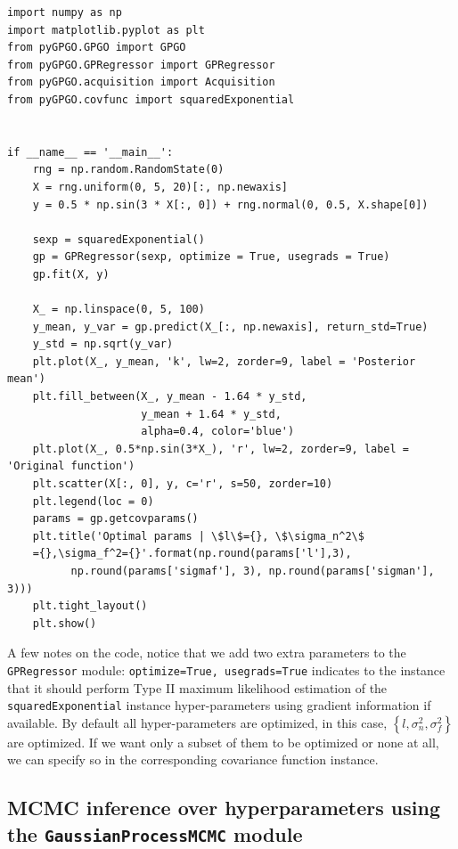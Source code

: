 \documentclass[10pt,a4paper,twoside]{book}
\begin{document}
\begin{verbatim}
import numpy as np
import matplotlib.pyplot as plt
from pyGPGO.GPGO import GPGO
from pyGPGO.GPRegressor import GPRegressor
from pyGPGO.acquisition import Acquisition
from pyGPGO.covfunc import squaredExponential


if __name__ == '__main__':
    rng = np.random.RandomState(0)
    X = rng.uniform(0, 5, 20)[:, np.newaxis]
    y = 0.5 * np.sin(3 * X[:, 0]) + rng.normal(0, 0.5, X.shape[0])

    sexp = squaredExponential()
    gp = GPRegressor(sexp, optimize = True, usegrads = True)
    gp.fit(X, y)

    X_ = np.linspace(0, 5, 100)
    y_mean, y_var = gp.predict(X_[:, np.newaxis], return_std=True)
    y_std = np.sqrt(y_var)
    plt.plot(X_, y_mean, 'k', lw=2, zorder=9, label = 'Posterior mean')
    plt.fill_between(X_, y_mean - 1.64 * y_std,
                     y_mean + 1.64 * y_std,
                     alpha=0.4, color='blue')
    plt.plot(X_, 0.5*np.sin(3*X_), 'r', lw=2, zorder=9, label = 'Original function')
    plt.scatter(X[:, 0], y, c='r', s=50, zorder=10)
    plt.legend(loc = 0)
    params = gp.getcovparams()
    plt.title('Optimal params | \$l\$={}, \$\sigma_n^2\$
    ={},\sigma_f^2={}'.format(np.round(params['l'],3),
    	  np.round(params['sigmaf'], 3), np.round(params['sigman'], 3)))
    plt.tight_layout()
    plt.show()
\end{verbatim}


A few notes on the code, notice that we add two extra parameters to the \texttt{GPRegressor} module: \texttt{optimize=True, usegrads=True} indicates to the instance that it should perform Type II maximum likelihood estimation of the \texttt{squaredExponential} instance hyper-parameters using gradient information if available. By default all hyper-parameters are optimized, in this case, $\left\lbrace l, \sigma_n^2, \sigma_f^2 \right\rbrace$ are optimized. If we want only a subset of them to be optimized or none at all, we can specify so in the corresponding covariance function instance. 


\subsection{MCMC inference over hyperparameters using the \texttt{GaussianProcessMCMC} module}
\end{document}
